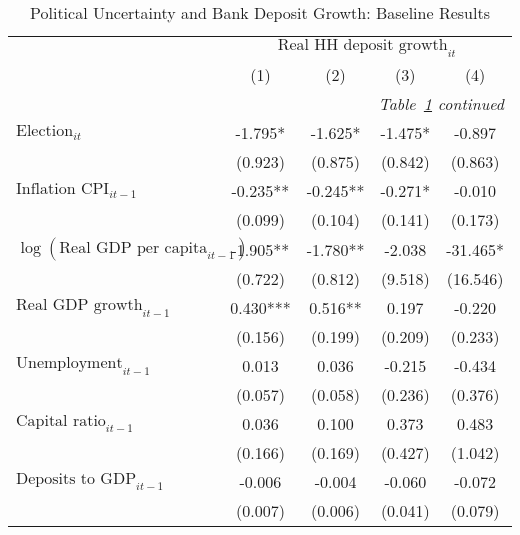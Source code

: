\begin{longtable}{m{8cm}*{4}{c}}                                         \caption{Political Uncertainty and Bank Deposit Growth: Baseline Results\label{baselinedeposits}}\\                                         \toprule                                         &\multicolumn{4}{c}{$\text{Real HH deposit growth}_{it}$} \\ \cmidrule(lr){2-5}
                    &         (1)   &         (2)   &         (3)   &         (4)   \\
\midrule\endfirsthead                                         \multicolumn{5}{r}{\textit{Table~\ref{baselinedeposits} continued}} \\                                         \toprule\endhead\midrule\endfoot\endlastfoot
$\text{Election}_{it}$&      -1.795*  &      -1.625*  &      -1.475*  &      -0.897   \\
                    &     (0.923)   &     (0.875)   &     (0.842)   &     (0.863)   \\
$\text{Inflation CPI}_{it-1}$&      -0.235** &      -0.245** &      -0.271*  &      -0.010   \\
                    &     (0.099)   &     (0.104)   &     (0.141)   &     (0.173)   \\
$\log(\text{Real GDP per capita}_{it-1})$&      -1.905** &      -1.780** &      -2.038   &     -31.465*  \\
                    &     (0.722)   &     (0.812)   &     (9.518)   &    (16.546)   \\
$\text{Real GDP growth}_{it-1}$&       0.430***&       0.516** &       0.197   &      -0.220   \\
                    &     (0.156)   &     (0.199)   &     (0.209)   &     (0.233)   \\
$\text{Unemployment}_{it-1}$&       0.013   &       0.036   &      -0.215   &      -0.434   \\
                    &     (0.057)   &     (0.058)   &     (0.236)   &     (0.376)   \\
$\text{Capital ratio}_{it-1}$&       0.036   &       0.100   &       0.373   &       0.483   \\
                    &     (0.166)   &     (0.169)   &     (0.427)   &     (1.042)   \\
$\text{Deposits to GDP}_{it-1}$&      -0.006   &      -0.004   &      -0.060   &      -0.072   \\
                    &     (0.007)   &     (0.006)   &     (0.041)   &     (0.079)   \\

\end{longtable}
